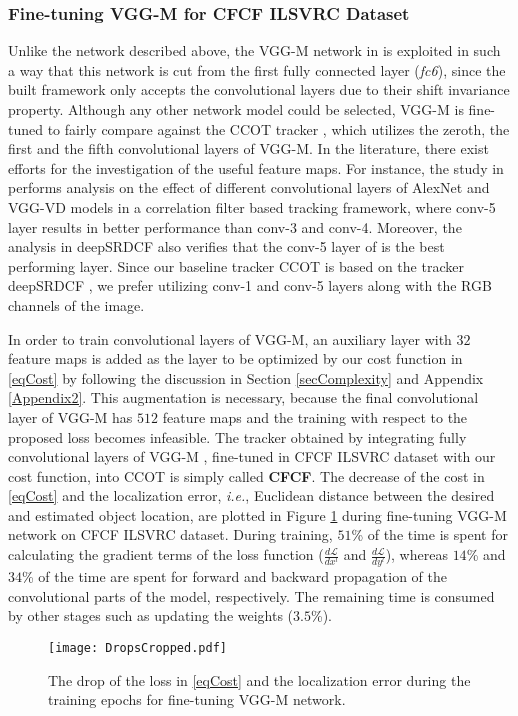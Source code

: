\documentclass[journal]{IEEEtran}
\begin{document}
\subsubsection{Fine-tuning VGG-M \cite{VGG} for CFCF ILSVRC Dataset}
Unlike the network described above, the VGG-M network in \cite{VGG} is exploited in such a way that this network is cut from the first fully connected layer (\emph{fc6}), since the built framework only accepts the convolutional layers due to their shift invariance property. Although any other network model could be selected, VGG-M is fine-tuned to fairly compare against the CCOT tracker \cite{CCOT}, which utilizes the zeroth, the first and the fifth convolutional layers of VGG-M. In the literature, there exist efforts for the investigation of the useful feature maps. For instance, the study in \cite{HCF} performs analysis on the effect of different convolutional layers of AlexNet \cite{ImageNetCNN} and VGG-VD \cite{VGG_verydeep} models in a correlation filter based tracking framework, where conv-5 layer results in better performance than conv-3 and conv-4. Moreover, the analysis in deepSRDCF \cite{deepSRDCF} also verifies that the conv-5 layer of \cite{VGG} is the best performing layer. Since our baseline tracker CCOT is based on the tracker deepSRDCF \cite{deepSRDCF}, we prefer utilizing conv-1 and conv-5 layers along with the RGB channels of the image.

In order to train convolutional layers of VGG-M, an auxiliary layer with $32$ feature maps is added as the layer to be optimized by our cost function in \eqref{eqCost} by following the discussion in Section \ref{secComplexity} and Appendix \ref{Appendix2}. This augmentation is necessary, because the final convolutional layer of VGG-M has $512$ feature maps and the training with respect to the proposed loss becomes infeasible. The tracker obtained by integrating fully convolutional layers of VGG-M \cite{VGG}, fine-tuned in CFCF ILSVRC dataset with our cost function, into CCOT is simply called \textbf{CFCF}. The decrease of the cost in \eqref{eqCost} and the localization error, \emph{i.e.}, Euclidean distance between the desired and estimated object location, are plotted in Figure \ref{costdrop} during fine-tuning VGG-M network on CFCF ILSVRC dataset. During training, $51$\% of the time is spent for calculating the gradient terms of the loss function ($\frac{d\mathcal{L}}{dx^l}$ and $\frac{d\mathcal{L}}{dy^l}$), whereas $14$\% and $34$\% of the time are spent for forward and backward propagation of the convolutional parts of the model, respectively. The remaining time is consumed by other stages such as updating the weights ($3.5$\%).
\begin{figure}[ht]
\centering
\texttt{[image: DropsCropped.pdf]}
\caption{The drop of the loss in \eqref{eqCost} and the localization error during the training epochs for fine-tuning VGG-M network.}
\label{costdrop}
\normalsize
\end{figure}
\end{document}

